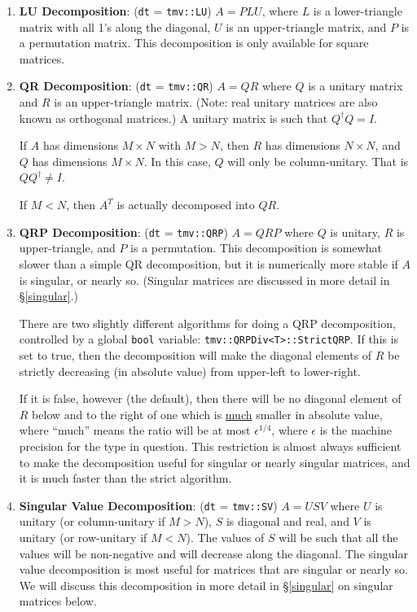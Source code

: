 \documentclass[twoside,letterpaper,11pt]{article}
\renewcommand{\tt}[1]{{\texttt {#1}}}
\begin{document}
\begin{enumerate}
\item
\textbf{LU Decomposition}: 
(\tt{dt} = \tt{tmv::LU}) $A = P L U$, where $L$ is a lower-triangle 
matrix with all 1's along the diagonal, $U$ is an upper-triangle matrix, 
and $P$ is a permutation matrix.  This decomposition is only available for 
square matrices.

\item
\textbf{QR Decomposition}: 
(\tt{dt} = \tt{tmv::QR}) $A = Q R$ where $Q$ is a unitary matrix
and $R$ is an upper-triangle matrix.  (Note: real unitary matrices are
also known as orthogonal matrices.)  A unitary matrix is such that
$Q^\dagger Q = I$. 

If $A$ has dimensions $M \times N$ with $M > N$, 
then $R$ has dimensions $N \times N$, and $Q$
has dimensions $M \times N$.  In this case, $Q$ will
only be column-unitary.  That is $Q Q^\dagger \neq I$.

If $M < N$, then $A^T$ is actually decomposed into $Q R$.

\item
\textbf{QRP Decomposition}: 
(\tt{dt} = \tt{tmv::QRP}) $A = Q R P$ where $Q$ is unitary, $R$ is 
upper-triangle, and $P$ is a permutation.  This decomposition is somewhat
slower than a simple QR decomposition, but it is numerically more stable if
$A$ is singular, or nearly so.  
(Singular matrices are discussed in more detail in \S\ref{singular}.)

There are two slightly different algorithms for doing a QRP decomposition, controlled by a global
\tt{bool} variable: \tt{tmv::QRPDiv<T>::StrictQRP}.
If this is set to true, then the decomposition will make the diagonal elements
of $R$ be strictly decreasing (in absolute value) from upper-left to lower-right.

If it is false, however (the default), then there will be no diagonal element
of $R$ below and to the right of one which is \underline{much} smaller in absolute value,
where ``much'' means the ratio will be at most $\epsilon^{1/4}$, where 
$\epsilon$ is the machine precision for the type in question.  This restriction
is almost always sufficient to make the decomposition useful for singular or nearly
singular matrices, and it is much faster than the strict algorithm.

\item
\textbf{Singular Value Decomposition}: 
(\tt{dt} = \tt{tmv::SV}) $A = U S V$ where $U$ is unitary
(or column-unitary if $M > N$), $S$ is diagonal and real, and $V$ is unitary 
(or row-unitary if $M < N$).  The values of $S$ will be such that all the values will
be non-negative and will decrease along the diagonal.
The singular value decomposition is most useful
for matrices that are singular or nearly so.  
We will discuss this decomposition in more detail in \S\ref{singular} on
singular matrices below.

\end{enumerate}
\end{document}
